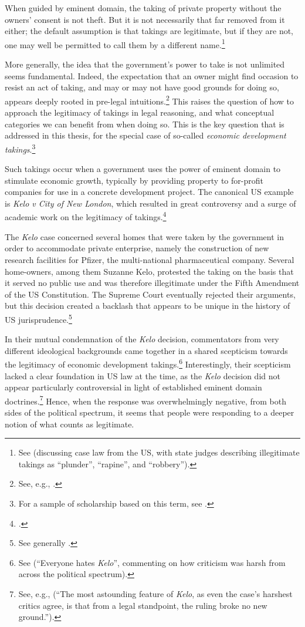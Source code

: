 When guided by eminent domain, the taking of private property without the owners' consent is not theft. But it is not necessarily that far removed from it either; the default assumption is that takings are legitimate, but if they are not, one may well be permitted to call them by a different name.\footnote{See \cite[8-10]{gray11} (discussing case law from the US, with state judges describing illegitimate takings as ``plunder'', ``rapine'', and ``robbery'').}

More generally, the idea that the government's power to take is not unlimited seems fundamental. Indeed, the expectation that an owner might find occasion to resist an act of taking, and may or may not have good grounds for doing so, appears deeply rooted in pre-legal intuitions.\footnote{See, e.g., \cite[159]{gray94}.} This raises the question of how to approach the legitimacy of takings in legal reasoning, and what conceptual categories we can benefit from when doing so. This is the key question that is addressed in this thesis, for the special case of so-called {\it economic development takings}.\footnote{For a sample of scholarship based on this term, see \cite{cohen06,somin07,wilt09,yellin11}.}

Such takings occur when a government uses the power of eminent domain to stimulate economic growth, typically by providing property to for-profit companies for use in a concrete development project. The canonical US example is {\it Kelo v City of New London}, which resulted in great controversy and a surge of academic work on the legitimacy of takings.\footcite{kelo05}

The {\it Kelo} case concerned several homes that were taken by the government in order to accommodate private enterprise, namely the construction of new research facilities for Pfizer, the multi-national pharmaceutical company. Several home-owners, among them Suzanne Kelo, protested the taking on the basis that it served no public use and was therefore illegitimate under the Fifth Amendment of the US Constitution. The Supreme Court eventually rejected their arguments, but this decision created a backlash that appears to be unique in the history of US jurisprudence.\footnote{See generally \cite{somin08}.}

In their mutual condemnation of the {\it Kelo} decision, commentators from very different ideological backgrounds came together in a shared scepticism towards the legitimacy of economic development takings.\footnote{See \cite[1413-1415]{bell06} (``Everyone hates {\it Kelo}'', commenting on how criticism was harsh from across the political spectrum).} Interestingly, their scepticism lacked a clear foundation in US law at the time, as the {\it Kelo} decision did not appear particularly controversial in light of established eminent domain doctrines.\footnote{See, e.g., \cite[1418]{bell06} (``The most astounding feature of {\it Kelo}, as even the case's harshest critics agree, is that from a legal standpoint, the ruling broke no new ground.'').} Hence, when the response was overwhelmingly negative, from both sides of the political spectrum, it seems that people were responding to a deeper notion of what counts as legitimate.

